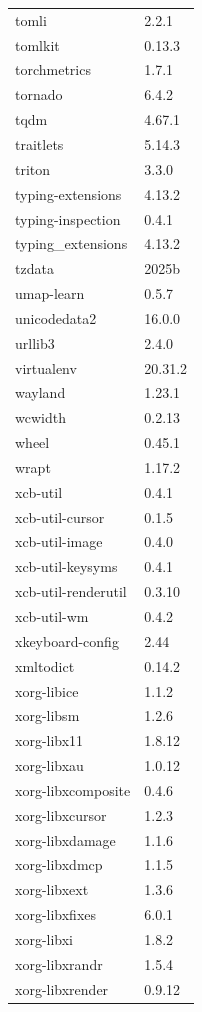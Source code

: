 \begin{longtable}{ll}
    tomli&2.2.1 \\
    tomlkit&0.13.3 \\
    torchmetrics&1.7.1 \\
    tornado&6.4.2 \\
    tqdm&4.67.1 \\
    traitlets&5.14.3 \\
    triton&3.3.0 \\
    typing-extensions&4.13.2 \\
    typing-inspection&0.4.1 \\
    typing\_extensions&4.13.2 \\
    tzdata&2025b \\
    umap-learn&0.5.7 \\
    unicodedata2&16.0.0 \\
    urllib3&2.4.0 \\
    virtualenv&20.31.2 \\
    wayland&1.23.1 \\
    wcwidth&0.2.13 \\
    wheel&0.45.1 \\
    wrapt&1.17.2 \\
    xcb-util&0.4.1 \\
    xcb-util-cursor&0.1.5 \\
    xcb-util-image&0.4.0 \\
    xcb-util-keysyms&0.4.1 \\
    xcb-util-renderutil&0.3.10 \\
    xcb-util-wm&0.4.2 \\
    xkeyboard-config&2.44 \\
    xmltodict&0.14.2 \\
    xorg-libice&1.1.2 \\
    xorg-libsm&1.2.6 \\
    xorg-libx11&1.8.12 \\
    xorg-libxau&1.0.12 \\
    xorg-libxcomposite&0.4.6 \\
    xorg-libxcursor&1.2.3 \\
    xorg-libxdamage&1.1.6 \\
    xorg-libxdmcp&1.1.5 \\
    xorg-libxext&1.3.6 \\
    xorg-libxfixes&6.0.1 \\
    xorg-libxi&1.8.2 \\
    xorg-libxrandr&1.5.4 \\
    xorg-libxrender&0.9.12 \\

\end{longtable}
